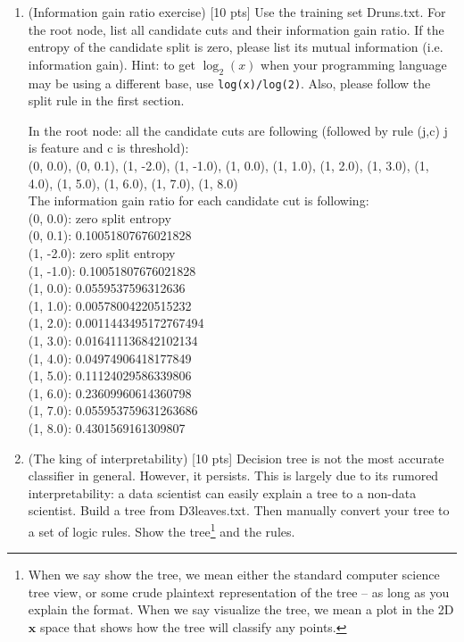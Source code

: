 \documentclass[a4paper]{article}
\theoremstyle{definition}
\def\x{\mathbf x}
\newenvironment{soln}{
    \leavevmode\color{blue}\ignorespaces
}{}
\begin{document}
\begin{enumerate}
\item (Information gain ratio exercise)  [10 pts] Use the training set Druns.txt.  For the root node, list all candidate cuts and their information gain ratio. If the entropy of the candidate split is zero, please list its mutual information (i.e. information gain). Hint: to get $\log_2(x)$ when your programming language may be using a different base, use \verb|log(x)/log(2)|. Also, please follow the split rule in the first section. \\
\begin{soln}
  In the root node: all the candidate cuts are following (followed by rule (j,c) j is feature and c is threshold): \\
  (0, 0.0), (0, 0.1), (1, -2.0), (1, -1.0), (1, 0.0), (1, 1.0), (1, 2.0), (1, 3.0), (1, 4.0), (1, 5.0), (1, 6.0), (1, 7.0), (1, 8.0) \\
  The information gain ratio for each candidate cut is following: \\
  (0, 0.0): zero split entropy \\
  (0, 0.1):  0.10051807676021828\\
  (1, -2.0): zero split entropy \\
  (1, -1.0): 0.10051807676021828 \\
  (1, 0.0): 0.0559537596312636 \\
  (1, 1.0): 0.00578004220515232 \\
  (1, 2.0): 0.0011443495172767494 \\
  (1, 3.0): 0.016411136842102134 \\
  (1, 4.0): 0.04974906418177849 \\
  (1, 5.0): 0.11124029586339806 \\
  (1, 6.0): 0.23609960614360798 \\
  (1, 7.0): 0.055953759631263686 \\
  (1, 8.0): 0.4301569161309807 \\
\end{soln}
\item (The king of interpretability)  [10 pts] Decision tree is not the most accurate classifier in general.  However, it persists.  This is largely due to its rumored interpretability: a data scientist can easily explain a tree to a non-data scientist.  Build a tree from D3leaves.txt.  Then manually convert your tree to a set of logic rules.  Show the tree\footnote{When we say show the tree, we mean either the standard computer science tree view, or some crude plaintext representation of the tree -- as long as you explain the format.  When we say visualize the tree, we mean a plot in the 2D $\x$ space that shows how the tree will classify any points.} and the rules. \\

\end{enumerate}
\end{document}
